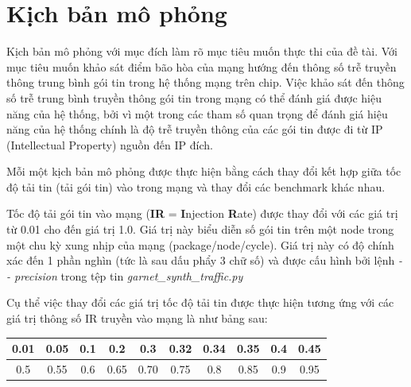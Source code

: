 \documentclass{article}
\begin{document}




\section{Kịch bản mô phỏng} \label{scenarioIntro}
Kịch bản mô phỏng với mục đích làm rõ mục tiêu muốn thực thi của đề tài. Với mục tiêu muốn khảo sát điểm bão hòa của mạng hướng đến thông số trễ truyền thông trung bình gói tin trong hệ thống mạng trên chip. Việc khảo sát đến thông số trễ trung bình truyền thông gói tin trong mạng có thể đánh giá được hiệu năng của hệ thống, bởi vì một trong các tham số quan trọng để đánh giá hiệu năng của hệ thống chính là độ trễ truyền thông của các gói tin được đi từ IP (Intellectual Property) nguồn đến IP đích.

Mỗi một kịch bản mô phỏng được thực hiện bằng cách thay đổi kết hợp giữa tốc độ tải tin (tải gói tin) vào trong mạng và thay đổi các benchmark khác nhau.

Tốc độ tải gói tin vào mạng (\textbf{IR} = \textbf{I}njection \textbf{R}ate) được thay đổi với các giá trị từ 0.01 cho đến giá trị 1.0. Giá trị này biểu diễn số gói tin trên một node trong một chu kỳ xung nhịp của mạng (package/node/cycle). Giá trị này có độ chính xác đến 1 phần nghìn (tức là sau dấu phẩy 3 chữ số) và được cấu hình bởi lệnh \textit{- - precision} trong tệp tin \textit{garnet\_synth\_traffic.py}

Cụ thể việc thay đổi các giá trị tốc độ tải tin được thực hiện tương ứng với các giá trị thông số IR truyền vào mạng là như bảng sau:
\begin{center}
\begin{tabular}{|c|c|c|c|c|c|c|c|c|c|}
	\hline
	0.01 & 0.05  &0.1  &0.2  &0.3  &0.32  &0.34  &0.35  &0.4  &0.45  \\ 
	\hline
	0.5 & 0.55  &0.6  &0.65  &0.70  &0.75  &0.8  &0.85  &0.9  &0.95 \\
	\hline
\end{tabular} 
\end{center}
\end{document}
